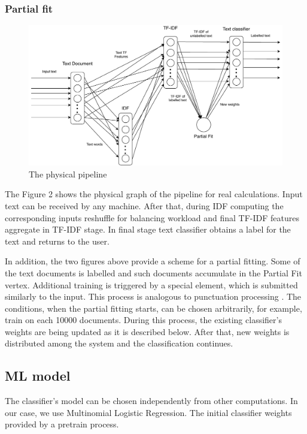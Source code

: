 \subsubsection{Partial fit}

\begin{figure}[htbp]
  \centering
  \includegraphics[scale=0.375]{pics/physical-graph}
  \caption{The physical pipeline}
  \label {physical graph}
\end{figure}

The Figure 2 shows the physical graph of the pipeline for real calculations. Input text can be received by any machine. After that, during IDF computing the corresponding inputs reshuffle for balancing workload and final TF-IDF features aggregate in TF-IDF stage. In final stage text classifier obtains a label for the text and returns to the user.

In addition, the two figures above provide a scheme for a partial fitting. Some of the text documents is labelled and such documents accumulate in the Partial Fit vertex. Additional training is triggered by a special element, which is submitted similarly to the input. This process is analogous to punctuation processing \cite{tucker2003exploiting}. The conditions, when the partial fitting starts, can be chosen arbitrarily, for example, train on each 10000 documents. During this process, the existing classifier's weights are being updated as it is described below. After that, new weights is distributed among the system and the classification continues. 

\subsection{ML model}

The classifier's model can be chosen independently from other computations. In our case, we use Multinomial Logistic Regression. The initial classifier weights provided by a pretrain process. 

